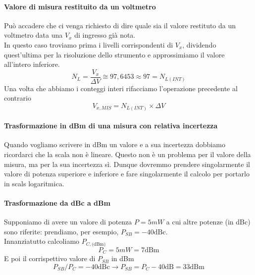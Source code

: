 \documentclass{article}
\begin{document}
	\paragraph*{Valore di misura restituito da un voltmetro}
	Può accadere che ci venga richiesto di dire quale sia il valore restituto da un voltmetro data una $V_x$ di ingresso già nota.\\
	In questo caso troviamo prima i livelli corrispondenti di $V_x$, dividendo quest'ultima per la risoluzione dello strumento e approssimiamo il valore all'intero inferiore.
	\begin{equation}
		N_{L} = \frac{V_x}{\Delta V} \cong 97,6453 \approx 97 = N_{L(INT)}
	\end{equation}
	Una volta che abbiamo i conteggi interi rifacciamo l'operazione precedente al contrario
	\begin{equation}
		V_{x,MIS} = N_{L(INT)} \times \Delta V
	\end{equation}
	\paragraph*{Trasformazione in dBm di una misura con relativa incertezza}
	Quando vogliamo scrivere in dBm un valore e a sua incertezza dobbiamo ricordarci che la scala non è lineare. Questo non è un problema per il valore della misura, ma per la sua incertezza sì. Dunque dovremmo prendere singolarmente il valore di potenza superiore e inferiore e fare singolarmente il calcolo per portarlo in scals logaritmica.
	\paragraph*{Trasformazione da dBc a dBm}
	Supponiamo di avere un valore di potenza $P = 5mW$ a cui altre potenze (in dBc) sono riferite: prendiamo, per esempio, $P_{SB} = -40 \text{dBc}$.\\
	Innanziatutto calcoliamo $P_{C,\text{(dBm)}}$
	\begin{equation}
		P_C = 5 mW = 7 \text{dBm}
	\end{equation}
	E poi il corrispettivo valore di $P_{SB}$ in dBm
	\begin{equation}
		P_{SB}/P_C = -40 \text{dBc} \to P_{SB} = P_C - 40 \text{dB} = 33 \text{dBm}
	\end{equation}
\end{document}
